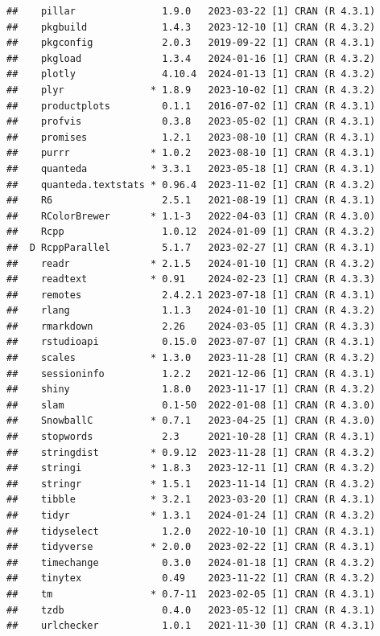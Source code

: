 \documentclass[print]{nuthesis}
\begin{document}
\begin{verbatim}
##    pillar               1.9.0   2023-03-22 [1] CRAN (R 4.3.1)
##    pkgbuild             1.4.3   2023-12-10 [1] CRAN (R 4.3.2)
##    pkgconfig            2.0.3   2019-09-22 [1] CRAN (R 4.3.1)
##    pkgload              1.3.4   2024-01-16 [1] CRAN (R 4.3.2)
##    plotly               4.10.4  2024-01-13 [1] CRAN (R 4.3.2)
##    plyr               * 1.8.9   2023-10-02 [1] CRAN (R 4.3.2)
##    productplots         0.1.1   2016-07-02 [1] CRAN (R 4.3.1)
##    profvis              0.3.8   2023-05-02 [1] CRAN (R 4.3.1)
##    promises             1.2.1   2023-08-10 [1] CRAN (R 4.3.1)
##    purrr              * 1.0.2   2023-08-10 [1] CRAN (R 4.3.1)
##    quanteda           * 3.3.1   2023-05-18 [1] CRAN (R 4.3.1)
##    quanteda.textstats * 0.96.4  2023-11-02 [1] CRAN (R 4.3.2)
##    R6                   2.5.1   2021-08-19 [1] CRAN (R 4.3.1)
##    RColorBrewer       * 1.1-3   2022-04-03 [1] CRAN (R 4.3.0)
##    Rcpp                 1.0.12  2024-01-09 [1] CRAN (R 4.3.2)
##  D RcppParallel         5.1.7   2023-02-27 [1] CRAN (R 4.3.1)
##    readr              * 2.1.5   2024-01-10 [1] CRAN (R 4.3.2)
##    readtext           * 0.91    2024-02-23 [1] CRAN (R 4.3.3)
##    remotes              2.4.2.1 2023-07-18 [1] CRAN (R 4.3.1)
##    rlang                1.1.3   2024-01-10 [1] CRAN (R 4.3.2)
##    rmarkdown            2.26    2024-03-05 [1] CRAN (R 4.3.3)
##    rstudioapi           0.15.0  2023-07-07 [1] CRAN (R 4.3.1)
##    scales             * 1.3.0   2023-11-28 [1] CRAN (R 4.3.2)
##    sessioninfo          1.2.2   2021-12-06 [1] CRAN (R 4.3.1)
##    shiny                1.8.0   2023-11-17 [1] CRAN (R 4.3.2)
##    slam                 0.1-50  2022-01-08 [1] CRAN (R 4.3.0)
##    SnowballC          * 0.7.1   2023-04-25 [1] CRAN (R 4.3.0)
##    stopwords            2.3     2021-10-28 [1] CRAN (R 4.3.1)
##    stringdist         * 0.9.12  2023-11-28 [1] CRAN (R 4.3.2)
##    stringi            * 1.8.3   2023-12-11 [1] CRAN (R 4.3.2)
##    stringr            * 1.5.1   2023-11-14 [1] CRAN (R 4.3.2)
##    tibble             * 3.2.1   2023-03-20 [1] CRAN (R 4.3.1)
##    tidyr              * 1.3.1   2024-01-24 [1] CRAN (R 4.3.2)
##    tidyselect           1.2.0   2022-10-10 [1] CRAN (R 4.3.1)
##    tidyverse          * 2.0.0   2023-02-22 [1] CRAN (R 4.3.1)
##    timechange           0.3.0   2024-01-18 [1] CRAN (R 4.3.2)
##    tinytex              0.49    2023-11-22 [1] CRAN (R 4.3.2)
##    tm                 * 0.7-11  2023-02-05 [1] CRAN (R 4.3.1)
##    tzdb                 0.4.0   2023-05-12 [1] CRAN (R 4.3.1)
##    urlchecker           1.0.1   2021-11-30 [1] CRAN (R 4.3.1)

\end{verbatim}
\end{document}
